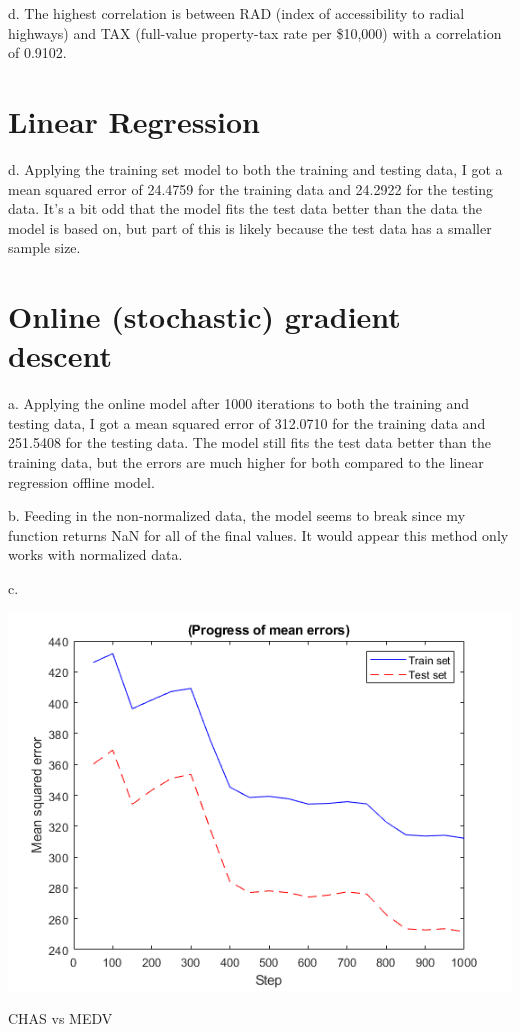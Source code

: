 \documentclass[a4paper]{article}
\begin{document}
\noindent 
d. The highest correlation is between RAD (index of accessibility to radial highways) and TAX (full-value property-tax rate per \$10,000) with a correlation of 0.9102.

\section{Linear Regression}
d. Applying the training set model to both the training and testing data, I got a mean squared error of 24.4759 for the training data and 24.2922 for the testing data. It's a bit odd that the model fits the test data better than the data the model is based on, but part of this is likely because the test data has a smaller sample size.


\section{Online (stochastic) gradient descent}
a. Applying the online model after 1000 iterations to both the training and testing data, I got a mean squared error of 312.0710 for the training data and 251.5408 for the testing data. The model still fits the test data better than the training data, but the errors are much higher for both compared to the linear regression offline model.

\noindent
b. Feeding in the non-normalized data, the model seems to break since my function returns NaN for all of the final values. It would appear this method only works with normalized data.

\noindent
c. 
\begin{center}
    \includegraphics[scale=1]{3c.png}
    \caption{CHAS vs MEDV}
\end{center}
\end{document}
